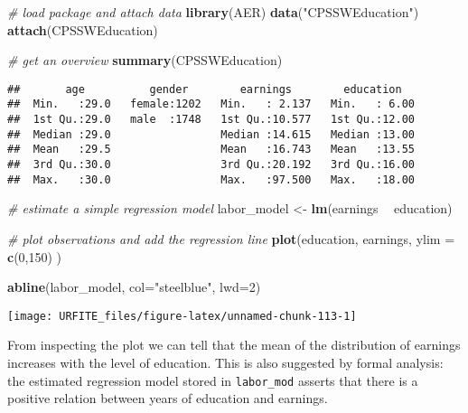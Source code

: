\documentclass[]{book}
\newenvironment{Shaded}{\begin{snugshade}}{\end{snugshade}}
\newcommand{\KeywordTok}[1]{\textcolor[rgb]{0.13,0.29,0.53}{\textbf{#1}}}
\newcommand{\DataTypeTok}[1]{\textcolor[rgb]{0.13,0.29,0.53}{#1}}
\newcommand{\DecValTok}[1]{\textcolor[rgb]{0.00,0.00,0.81}{#1}}
\newcommand{\StringTok}[1]{\textcolor[rgb]{0.31,0.60,0.02}{#1}}
\newcommand{\CommentTok}[1]{\textcolor[rgb]{0.56,0.35,0.01}{\textit{#1}}}
\newcommand{\OperatorTok}[1]{\textcolor[rgb]{0.81,0.36,0.00}{\textbf{#1}}}
\newcommand{\NormalTok}[1]{#1}
\theoremstyle{definition}
\theoremstyle{definition}
\theoremstyle{definition}
\theoremstyle{remark}
\begin{document}
\begin{Shaded}
\begin{Highlighting}[]
\CommentTok{# load package and attach data}
\KeywordTok{library}\NormalTok{(AER)}
\KeywordTok{data}\NormalTok{(}\StringTok{"CPSSWEducation"}\NormalTok{)}
\KeywordTok{attach}\NormalTok{(CPSSWEducation)}

\CommentTok{# get an overview}
\KeywordTok{summary}\NormalTok{(CPSSWEducation)}
\end{Highlighting}
\end{Shaded}

\begin{verbatim}
##       age          gender        earnings        education    
##  Min.   :29.0   female:1202   Min.   : 2.137   Min.   : 6.00  
##  1st Qu.:29.0   male  :1748   1st Qu.:10.577   1st Qu.:12.00  
##  Median :29.0                 Median :14.615   Median :13.00  
##  Mean   :29.5                 Mean   :16.743   Mean   :13.55  
##  3rd Qu.:30.0                 3rd Qu.:20.192   3rd Qu.:16.00  
##  Max.   :30.0                 Max.   :97.500   Max.   :18.00
\end{verbatim}

\begin{Shaded}
\begin{Highlighting}[]
\CommentTok{# estimate a simple regression model}
\NormalTok{labor_model <-}\StringTok{ }\KeywordTok{lm}\NormalTok{(earnings }\OperatorTok{~}\StringTok{ }\NormalTok{education)}

\CommentTok{# plot observations and add the regression line}
\KeywordTok{plot}\NormalTok{(education, }
\NormalTok{     earnings, }
     \DataTypeTok{ylim =} \KeywordTok{c}\NormalTok{(}\DecValTok{0}\NormalTok{,}\DecValTok{150}\NormalTok{)}
\NormalTok{     )}

\KeywordTok{abline}\NormalTok{(labor_model, }\DataTypeTok{col=}\StringTok{"steelblue"}\NormalTok{, }\DataTypeTok{lwd=}\DecValTok{2}\NormalTok{)}
\end{Highlighting}
\end{Shaded}

\begin{center}\texttt{[image: URFITE\_files/figure-latex/unnamed-chunk-113-1]} \end{center}

From inspecting the plot we can tell that the mean of the distribution
of earnings increases with the level of education. This is also
suggested by formal analysis: the estimated regression model stored in
\texttt{labor\_mod} asserts that there is a positive relation between
years of education and earnings.
\end{document}
